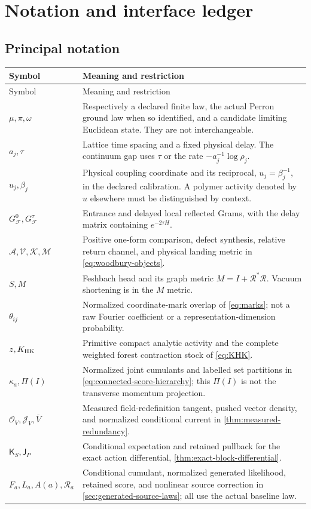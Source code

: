\documentclass[11pt,oneside,openany]{book}
\theoremstyle{definition}
\theoremstyle{remark}
\begin{document}
\appendix
\chapter{Notation and interface ledger}
\label{app:notation}
\section{Principal notation}
\begin{longtable}{L{0.23\textwidth}L{0.70\textwidth}}
\toprule Symbol & Meaning and restriction \\ \midrule
\endfirsthead
\toprule Symbol & Meaning and restriction \\ \midrule
\endhead
$\mu,\pi,\omega$ & Respectively a declared finite law, the actual Perron ground law when so identified, and a candidate limiting Euclidean state. They are not interchangeable. \\
$a_j,\tau$ & Lattice time spacing and a fixed physical delay. The continuum gap uses $\tau$ or the rate $-a_j^{-1}\log\rho_j$. \\
$u_j,\beta_j$ & Physical coupling coordinate and its reciprocal, $u_j=\beta_j^{-1}$, in the declared calibration. A polymer activity denoted by $u$ elsewhere must be distinguished by context. \\
$G_{\mathcal F}^0,G_{\mathcal F}^\tau$ & Entrance and delayed local reflected Grams, with the delay matrix containing $e^{-2\tau H}$. \\
$\mathcal A,\mathcal V,\mathcal K,\mathcal M$ & Positive one-form comparison, defect synthesis, relative return channel, and physical landing metric in \cref{eq:woodbury-objects}. \\
$S,M$ & Feshbach head and its graph metric $M=I+\mathcal R^*\mathcal R$. Vacuum shortening is in the $M$ metric. \\
$\theta_{ij}$ & Normalized coordinate-mark overlap of \cref{eq:marks}; not a raw Fourier coefficient or a representation-dimension probability. \\
$z,K_{\rm HK}$ & Primitive compact analytic activity and the complete weighted forest contraction stock of \cref{eq:KHK}. \\
$\kappa_a,\Pi(I)$ & Normalized joint cumulants and labelled set partitions in \cref{eq:connected-score-hierarchy}; this $\Pi(I)$ is not the transverse momentum projection. \\
$\mathcal O_V,\mathcal J_V,\overline V$ & Measured field-redefinition tangent, pushed vector density, and normalized conditional current in \cref{thm:measured-redundancy}. \\
$\mathsf K_S,\mathsf J_P$ & Conditional expectation and retained pullback for the exact action differential, \cref{thm:exact-block-differential}. \\
$F_a,L_a,A(a),\mathcal R_a$ & Conditional cumulant, normalized generated likelihood, retained score, and nonlinear source correction in \cref{sec:generated-source-laws}; all use the actual baseline law. \\


\end{longtable}
\end{document}
